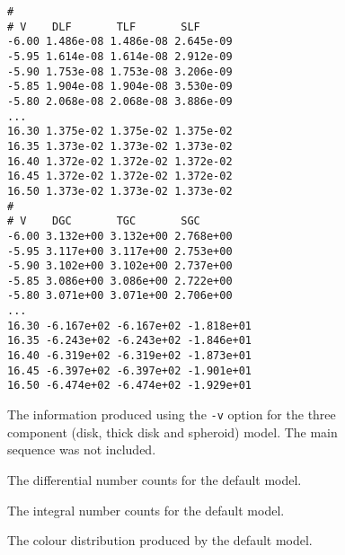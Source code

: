 \begin{figure}[p]
\begin{center}
\begin{verbatim}
#
# V    DLF       TLF       SLF
-6.00 1.486e-08 1.486e-08 2.645e-09
-5.95 1.614e-08 1.614e-08 2.912e-09
-5.90 1.753e-08 1.753e-08 3.206e-09
-5.85 1.904e-08 1.904e-08 3.530e-09
-5.80 2.068e-08 2.068e-08 3.886e-09
...
16.30 1.375e-02 1.375e-02 1.375e-02
16.35 1.373e-02 1.373e-02 1.373e-02
16.40 1.372e-02 1.372e-02 1.372e-02
16.45 1.372e-02 1.372e-02 1.372e-02
16.50 1.373e-02 1.373e-02 1.373e-02
#
# V    DGC       TGC       SGC
-6.00 3.132e+00 3.132e+00 2.768e+00
-5.95 3.117e+00 3.117e+00 2.753e+00
-5.90 3.102e+00 3.102e+00 2.737e+00
-5.85 3.086e+00 3.086e+00 2.722e+00
-5.80 3.071e+00 3.071e+00 2.706e+00
...
16.30 -6.167e+02 -6.167e+02 -1.818e+01
16.35 -6.243e+02 -6.243e+02 -1.846e+01
16.40 -6.319e+02 -6.319e+02 -1.873e+01
16.45 -6.397e+02 -6.397e+02 -1.901e+01
16.50 -6.474e+02 -6.474e+02 -1.929e+01
\end{verbatim}
\end{center}
\caption{The information produced using the {\tt -v} option for the three 
component (disk, thick disk and spheroid) model. The main sequence was not
included.}
\end{figure}

\begin{figure}[p]
\centerline{}
\caption{The differential number counts for the default model.}
\end{figure}

\begin{figure}[p]
\centerline{}
\caption{The integral number counts for the default model.}
\end{figure}

\begin{figure}[p]
\centerline{}
\caption{The colour distribution produced by the default model.}
\end{figure}


